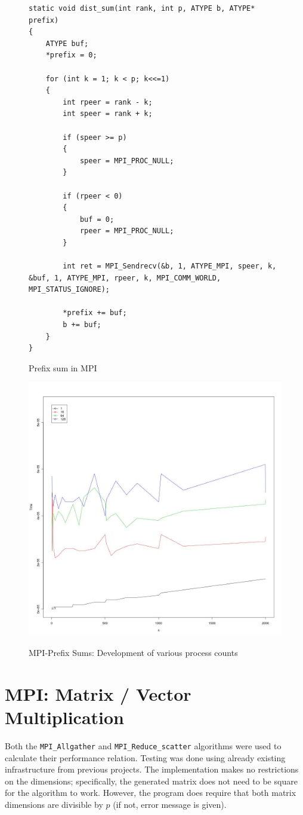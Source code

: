 \documentclass[12pt]{article}
\begin{document}
\begin{figure}[H]
\label{mpi_prefix_code}
\caption{Prefix sum in MPI}
\begin{lstlisting}
static void dist_sum(int rank, int p, ATYPE b, ATYPE* prefix)
{
	ATYPE buf;
	*prefix = 0;

	for (int k = 1; k < p; k<<=1) 
	{
		int rpeer = rank - k;
		int speer = rank + k;

		if (speer >= p)
		{
			speer = MPI_PROC_NULL;	
		}

		if (rpeer < 0)
		{
			buf = 0;
			rpeer = MPI_PROC_NULL;
		}

		int ret = MPI_Sendrecv(&b, 1, ATYPE_MPI, speer, k, &buf, 1, ATYPE_MPI, rpeer, k, MPI_COMM_WORLD, MPI_STATUS_IGNORE);
		
		*prefix += buf;
		b += buf;
	}
}
\end{lstlisting}

\end{figure}


\begin{figure}[H]
\centering
\caption{MPI-Prefix Sums: Development of various process counts}
\includegraphics[scale=0.3]{candidate-graphs/mpi_p2-prefix-sums.jpg}
\label{mpi_p2_graph}
\end{figure}


\newpage
\section{MPI: Matrix / Vector Multiplication}
Both the \verb=MPI_Allgather= and \verb=MPI_Reduce_scatter= algorithms were used to calculate their performance relation. Testing was done using already existing infrastructure from previous projects. The implementation makes no restrictions on the dimensions; specifically, the generated matrix does not need to be square for the algorithm to work. However, the program does require that both matrix dimensions are divisible by $p$ (if not, error message is given). 
\end{document}
